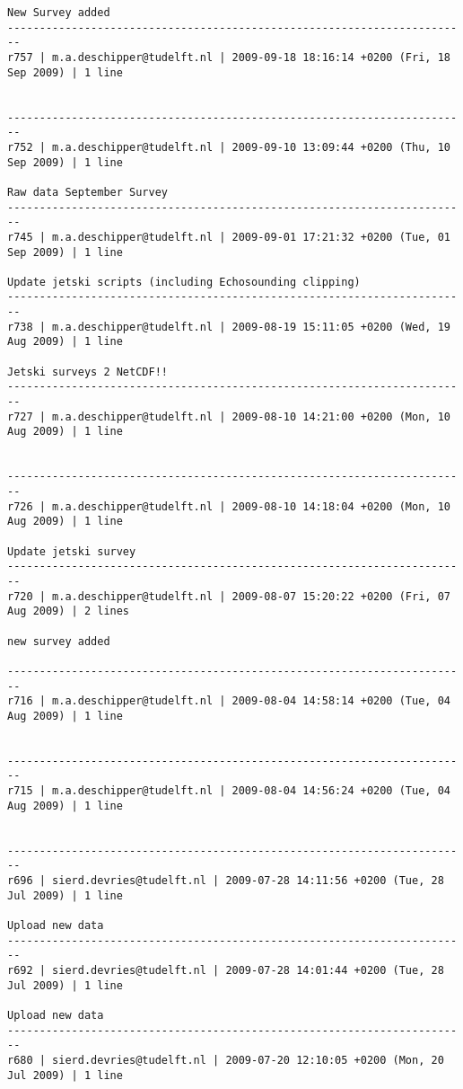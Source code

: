 \documentclass[9]{report}
\begin{document}
\begin{description}
\begin{verbatim}
New Survey added
------------------------------------------------------------------------
r757 | m.a.deschipper@tudelft.nl | 2009-09-18 18:16:14 +0200 (Fri, 18 Sep 2009) | 1 line


------------------------------------------------------------------------
r752 | m.a.deschipper@tudelft.nl | 2009-09-10 13:09:44 +0200 (Thu, 10 Sep 2009) | 1 line

Raw data September Survey
------------------------------------------------------------------------
r745 | m.a.deschipper@tudelft.nl | 2009-09-01 17:21:32 +0200 (Tue, 01 Sep 2009) | 1 line

Update jetski scripts (including Echosounding clipping)
------------------------------------------------------------------------
r738 | m.a.deschipper@tudelft.nl | 2009-08-19 15:11:05 +0200 (Wed, 19 Aug 2009) | 1 line

Jetski surveys 2 NetCDF!!
------------------------------------------------------------------------
r727 | m.a.deschipper@tudelft.nl | 2009-08-10 14:21:00 +0200 (Mon, 10 Aug 2009) | 1 line


------------------------------------------------------------------------
r726 | m.a.deschipper@tudelft.nl | 2009-08-10 14:18:04 +0200 (Mon, 10 Aug 2009) | 1 line

Update jetski survey 
------------------------------------------------------------------------
r720 | m.a.deschipper@tudelft.nl | 2009-08-07 15:20:22 +0200 (Fri, 07 Aug 2009) | 2 lines

new survey added

------------------------------------------------------------------------
r716 | m.a.deschipper@tudelft.nl | 2009-08-04 14:58:14 +0200 (Tue, 04 Aug 2009) | 1 line


------------------------------------------------------------------------
r715 | m.a.deschipper@tudelft.nl | 2009-08-04 14:56:24 +0200 (Tue, 04 Aug 2009) | 1 line


------------------------------------------------------------------------
r696 | sierd.devries@tudelft.nl | 2009-07-28 14:11:56 +0200 (Tue, 28 Jul 2009) | 1 line

Upload new data
------------------------------------------------------------------------
r692 | sierd.devries@tudelft.nl | 2009-07-28 14:01:44 +0200 (Tue, 28 Jul 2009) | 1 line

Upload new data
------------------------------------------------------------------------
r680 | sierd.devries@tudelft.nl | 2009-07-20 12:10:05 +0200 (Mon, 20 Jul 2009) | 1 line


\end{verbatim}
\end{description}
\end{document}
